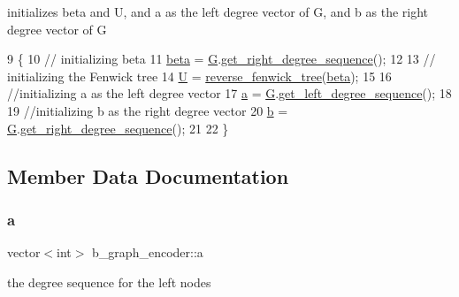 initializes beta and U, and a as the left degree vector of G, and b as the right degree vector of G 


\begin{DoxyCode}
9 \{
10   \textcolor{comment}{// initializing beta}
11   \hyperlink{classb__graph__encoder_ae54d76cc4cee399d98951f870897a144}{beta} = \hyperlink{classb__graph__encoder_af969e24f445db0e54513086604e2c165}{G}.\hyperlink{classb__graph_a2711566385b92b02f4c03abdc1f9a582}{get\_right\_degree\_sequence}();
12 
13   \textcolor{comment}{// initializing the Fenwick tree}
14   \hyperlink{classb__graph__encoder_ac810138443002a2b2cf579ced2dc34ce}{U} = \hyperlink{classreverse__fenwick__tree}{reverse\_fenwick\_tree}(\hyperlink{classb__graph__encoder_ae54d76cc4cee399d98951f870897a144}{beta});
15 
16   \textcolor{comment}{//initializing a as the left degree vector}
17   \hyperlink{classb__graph__encoder_afd22d167f495cd85b41397f337c377c2}{a} = \hyperlink{classb__graph__encoder_af969e24f445db0e54513086604e2c165}{G}.\hyperlink{classb__graph_afd65fb655f7e24217393a10533b87d3c}{get\_left\_degree\_sequence}();
18 
19   \textcolor{comment}{//initializing b as the right degree vector}
20   \hyperlink{classb__graph__encoder_a767826e268702e45ab71565e096a52b8}{b} = \hyperlink{classb__graph__encoder_af969e24f445db0e54513086604e2c165}{G}.\hyperlink{classb__graph_a2711566385b92b02f4c03abdc1f9a582}{get\_right\_degree\_sequence}();
21     
22 \}
\end{DoxyCode}


\subsection{Member Data Documentation}
\mbox{\label{classb__graph__encoder_afd22d167f495cd85b41397f337c377c2}} 
\subsubsection{\texorpdfstring{a}{a}}
{\footnotesize\ttfamily vector$<$int$>$ b\+\_\+graph\+\_\+encoder\+::a\hspace{0.3cm}{\ttfamily [private]}}



the degree sequence for the left nodes 

\mbox{\label{classb__graph__encoder_a767826e268702e45ab71565e096a52b8}} 
